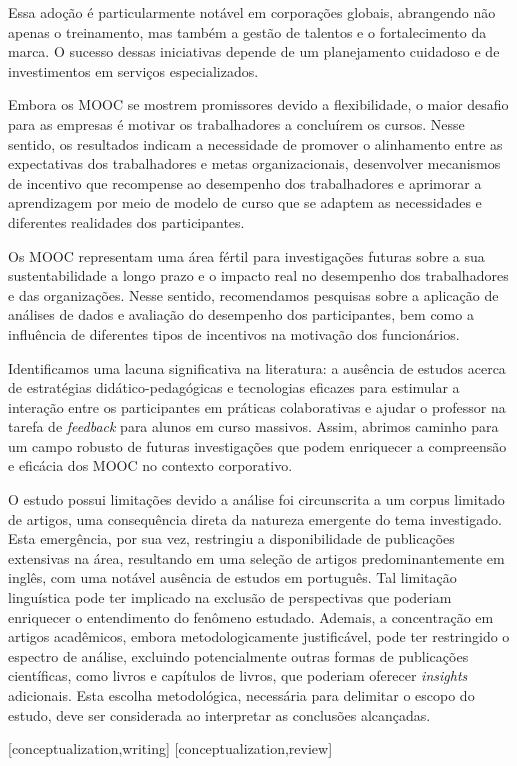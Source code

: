 \documentclass[portuguese]{textolivre}
\begin{document}
Essa adoção é particularmente notável em corporações globais, abrangendo não apenas o treinamento, mas também a gestão de talentos e o fortalecimento da marca. O sucesso dessas iniciativas depende de um planejamento cuidadoso e de investimentos em serviços especializados.

Embora os MOOC se mostrem promissores devido a flexibilidade, o maior desafio para as empresas é motivar os trabalhadores a concluírem os cursos. Nesse sentido, os resultados indicam a necessidade de promover o alinhamento entre as expectativas dos trabalhadores e metas organizacionais, desenvolver mecanismos de incentivo que recompense ao desempenho dos trabalhadores e aprimorar a aprendizagem por meio de modelo de curso que se adaptem as necessidades e diferentes realidades dos participantes. 

Os MOOC representam uma área fértil para investigações futuras sobre a sua sustentabilidade a longo prazo e o impacto real no desempenho dos trabalhadores e das organizações. Nesse sentido, recomendamos pesquisas sobre a aplicação de análises de dados e avaliação do desempenho dos participantes, bem como a influência de diferentes tipos de incentivos na motivação dos funcionários.

Identificamos uma lacuna significativa na literatura: a ausência de estudos acerca de estratégias didático-pedagógicas e tecnologias eficazes para estimular a interação entre os participantes em práticas colaborativas e ajudar o professor na tarefa de \textit{feedback} para alunos em curso massivos. Assim, abrimos caminho para um campo robusto de futuras investigações que podem enriquecer a compreensão e eficácia dos MOOC no contexto corporativo.

O estudo possui limitações devido a análise foi circunscrita a um corpus limitado de artigos, uma consequência direta da natureza emergente do tema investigado. Esta emergência, por sua vez, restringiu a disponibilidade de publicações extensivas na área, resultando em uma seleção de artigos predominantemente em inglês, com uma notável ausência de estudos em português. Tal limitação linguística pode ter implicado na exclusão de perspectivas que poderiam enriquecer o entendimento do fenômeno estudado. Ademais, a concentração em artigos acadêmicos, embora metodologicamente justificável, pode ter restringido o espectro de análise, excluindo potencialmente outras formas de publicações científicas, como livros e capítulos de livros, que poderiam oferecer \textit{insights} adicionais. Esta escolha metodológica, necessária para delimitar o escopo do estudo, deve ser considerada ao interpretar as conclusões alcançadas.



\printbibliography\label{sec-bib}
\begin{contributors}
[conceptualization,writing]
[conceptualization,review]
\end{contributors}
\end{document}
